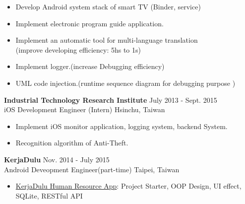 \documentclass{res}
\begin{document}
\begin{resume}
				\begin{itemize}[leftmargin=*]
					\item Develop Android system stack of smart TV (Binder, service)	
					\vspace{-0.05in}
					\item Implement electronic program guide application.
					\vspace{-0.05in}
					\item Implement an automatic tool for multi-language translation \\(improve developing efficiency: 5hs to 1s)
					\vspace{-0.05in}		
					\item Implement logger.(increase Debugging efficiency)
					\vspace{-0.05in}	
					\item UML code injection.(runtime sequence diagram for debugging purpose )
				\end{itemize}
				\vspace{-0.1in}
				{\bf Industrial Technology Research Institute } {\hfill July 2013 - Sept. 2015}\\	
				iOS Development Engineer (Intern)                        {\hfill Hsinchu, Taiwan}

				\begin{itemize}[leftmargin=*]
					\item Implement iOS monitor application, logging system, backend System.
					\vspace{-0.05in} 
					\item Recognition algorithm of Anti-Theft.
					\vspace{-0.05in}
				\end{itemize}
				\vspace{-0.1in}

	 			{\bf KerjaDulu }                                {\hfill  Nov. 2014 - July 2015}\\
				Android Deveopment Engineer(part-time)			    	 {\hfill Taipei, Taiwan}
		
				\begin{itemize}[leftmargin=*]
					\item {\href{https://play.google.com/store/apps/details?id=com.kerjadulu.kerjadulu&hl=zh_TW}{KerjaDulu Human Resource App}}: Project Starter, OOP Design, UI effect, SQLite, RESTful API
				\end{itemize}
				\vspace{-0.1in}


\end{resume}
\end{document}
